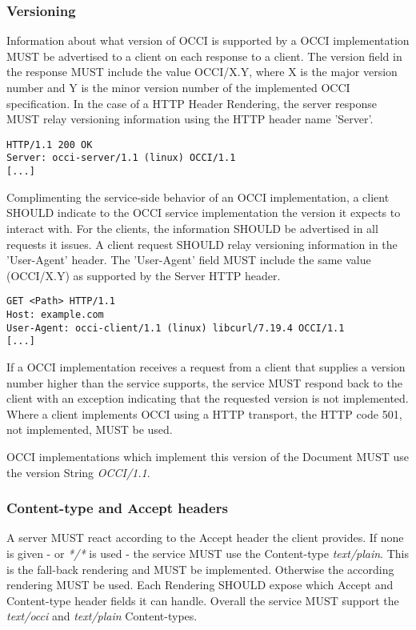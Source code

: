 \documentclass[10pt,a4paper]{article}
\begin{document}
\subsubsection{Versioning}
Information about what version of OCCI is supported by a OCCI
implementation MUST be advertised to a client on each response to a
client. The version field in the response MUST include the value
OCCI/X.Y, where X is the major version number and Y is the minor
version number of the implemented OCCI specification. In the case of a
HTTP Header Rendering, the server response MUST relay versioning
information using the HTTP header name 'Server'.

\begin{verbatim}
HTTP/1.1 200 OK
Server: occi-server/1.1 (linux) OCCI/1.1
[...]
\end{verbatim}

Complimenting the service-side behavior of an OCCI implementation, a
client SHOULD indicate to the OCCI service implementation the version
it expects to interact with. For the clients, the information SHOULD
be advertised in all requests it issues. A client request SHOULD relay
versioning information in the 'User-Agent' header. The 'User-Agent'
field MUST include the same value (OCCI/X.Y) as supported by the
Server HTTP header.

\begin{verbatim}
GET <Path> HTTP/1.1
Host: example.com
User-Agent: occi-client/1.1 (linux) libcurl/7.19.4 OCCI/1.1
[...]
\end{verbatim}

If a OCCI implementation receives a request from a client that
supplies a version number higher than the service supports, the
service MUST respond back to the client with an exception indicating
that the requested version is not implemented. Where a client
implements OCCI using a HTTP transport, the HTTP code 501, not
implemented, MUST be used.

OCCI implementations which implement this version of the Document MUST
use the version String \emph{OCCI/1.1}.

\subsubsection{Content-type and Accept headers}
\label{sec:content_type}
A server MUST react according to the Accept header the client
provides. If none is given - or \textit{*/*} is used - the service
MUST use the Content-type \emph{text/plain}. This is the fall-back
rendering and MUST be implemented. Otherwise the according rendering
MUST be used. Each Rendering SHOULD expose which Accept and
Content-type header fields it can handle. Overall the service MUST
support the \textit{text/occi} and \textit{text/plain} Content-types.
\end{document}
